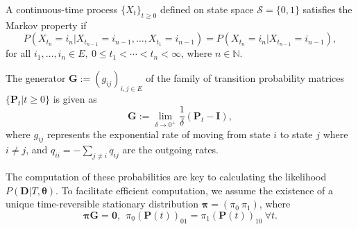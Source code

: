\begin{definition} 
\label{def:markov}
    A continuous-time process $\{X_t\}_{t \geq 0}$ defined on state space $\mathcal{S} = \{0, 1\}$ satisfies the Markov property if 
    \begin{equation}
        P\left(X_{t_n} = i_n | X_{t_{n-1}} = i_{n-1}, \dots, X_{t_1} = i_{n-1}\right) = P\left(X_{t_n} = i_n | X_{t_{n-1}} = i_{n-1}\right),
    \end{equation}
    for all $i_1, \dots, i_n \in E, \ 0 \leq t_1 < \cdots < t_n < \infty$, where $n \in \mathbb{N}$.
\end{definition}

\begin{definition} 
\label{def:generator}
    The generator $\mathbf{G} := (g_{ij})_{i, j \in E}$ of the family of transition probability matrices $\{\mathbf{P}_t | t\geq 0 \}$ is given as 
    \begin{equation}
        \mathbf{G} := \lim\limits_{\delta \to 0^+} \frac{1}{\delta}(\mathbf{P}_t - \mathbf{I}),
    \end{equation}
    where $g_{ij}$ represents the exponential rate of moving from state $i$ to state $j$ where $i \neq j$, and $q_{ii} = -\sum_{j\neq i} q_{ij}$ are the outgoing rates.
\end{definition}

The computation of these probabilities are key to calculating the likelihood $P(\mathbf{D} | T, \boldsymbol{\theta})$. To facilitate efficient computation, we assume the existence of a unique time-reversible stationary distribution $\boldsymbol{\pi} = (\pi_0 \ \pi_1)$, where 
\begin{equation}
\label{eq:detailedbalance}
    \boldsymbol{\pi}\mathbf{G} = \mathbf{0}, \ \  \pi_0 (\mathbf{P}(t))_{01} = \pi_1 (\mathbf{P}(t))_{10} \ \forall t.
\end{equation}

